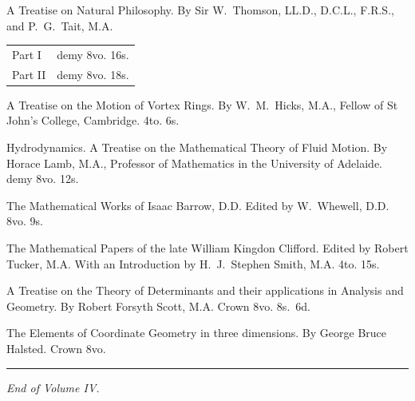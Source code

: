 \documentclass[11pt,a4paper]{book}
\begin{document}
\vspace{1em}

\noindent A Treatise on Natural Philosophy. By Sir W.~Thomson, LL.D., D.C.L., F.R.S., and P.~G.~Tait, M.A.

\begin{tabular}{ll}
Part I & demy 8vo. 16s.\\
Part II & demy 8vo. 18s.
\end{tabular}

\vspace{1em}

\noindent A Treatise on the Motion of Vortex Rings. By W.~M.~Hicks, M.A., Fellow of St John's College, Cambridge. 4to. 6s.

\vspace{0.5em}

\noindent Hydrodynamics. A Treatise on the Mathematical Theory of Fluid Motion. By Horace Lamb, M.A., Professor of Mathematics in the University of Adelaide. demy 8vo. 12s.

\vspace{0.5em}

\noindent The Mathematical Works of Isaac Barrow, D.D. Edited by W.~Whewell, D.D. 8vo. 9s.

\vspace{0.5em}

\noindent The Mathematical Papers of the late William Kingdon Clifford. Edited by Robert Tucker, M.A. With an Introduction by H.~J.~Stephen Smith, M.A. 4to. 15s.

\vspace{0.5em}

\noindent A Treatise on the Theory of Determinants and their applications in Analysis and Geometry. By Robert Forsyth Scott, M.A. Crown 8vo. 8s.~6d.

\vspace{0.5em}

\noindent The Elements of Coordinate Geometry in three dimensions. By George Bruce Halsted. Crown 8vo.

\vspace{2em}

\begin{center}
\rule{0.5\textwidth}{0.4pt}
\end{center}

\vspace{2em}

\begin{center}
\textit{End of Volume IV.}
\end{center}
\clearpage
\end{document}
